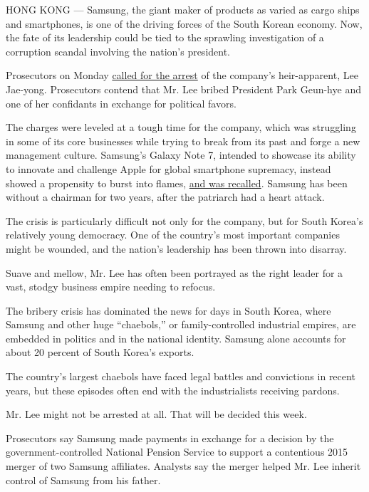 HONG KONG --- Samsung, the giant maker of products as varied as cargo
ships and smartphones, is one of the driving forces of the South Korean
economy. Now, the fate of its leadership could be tied to the sprawling
investigation of a corruption scandal involving the nation's president.

Prosecutors on Monday
\href{https://www.nytimes3xbfgragh.onion/2017/01/15/world/asia/south-korea-samsung-arrest-jay-lee-park-geun-hye.html}{called
for the arrest} of the company's heir-apparent, Lee Jae-yong.
Prosecutors contend that Mr. Lee bribed President Park Geun-hye and one
of her confidants in exchange for political favors.

The charges were leveled at a tough time for the company, which was
struggling in some of its core businesses while trying to break from its
past and forge a new management culture. Samsung's Galaxy Note 7,
intended to showcase its ability to innovate and challenge Apple for
global smartphone supremacy, instead showed a propensity to burst into
flames,
\href{https://www.nytimes3xbfgragh.onion/2016/09/03/business/samsung-galaxy-note-battery.html}{and
was recalled}. Samsung has been without a chairman for two years, after
the patriarch had a heart attack.

The crisis is particularly difficult not only for the company, but for
South Korea's relatively young democracy. One of the country's most
important companies might be wounded, and the nation's leadership has
been thrown into disarray.

Suave and mellow, Mr. Lee has often been portrayed as the right leader
for a vast, stodgy business empire needing to refocus.

The bribery crisis has dominated the news for days in South Korea, where
Samsung and other huge ``chaebols,'' or family-controlled industrial
empires, are embedded in politics and in the national identity. Samsung
alone accounts for about 20 percent of South Korea's exports.

The country's largest chaebols have faced legal battles and convictions
in recent years, but these episodes often end with the industrialists
receiving pardons.

Mr. Lee might not be arrested at all. That will be decided this week.

Prosecutors say Samsung made payments in exchange for a decision by the
government-controlled National Pension Service to support a contentious
2015 merger of two Samsung affiliates. Analysts say the merger helped
Mr. Lee inherit control of Samsung from his father.

